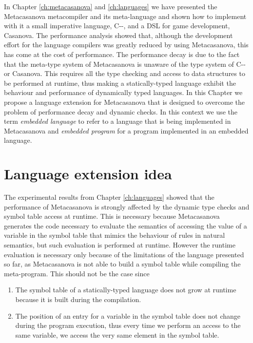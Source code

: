 In Chapter \ref{ch:metacasanova} and \ref{ch:languages} we have presented the Metacasanova metacompiler and its meta-language and shown how to implement with it a small imperative language, C-{}-, and a DSL for game development, Casanova. The performance analysis showed that, although the development effort for the language compilers was greatly reduced by using Metacasanova, this has come at the cost of performance. The performance decay is due to the fact that the meta-type system of Metacasanova is unaware of the type system of C-{}- or Casanova. This requires all the type checking and access to data structures to be performed at runtime, thus making a statically-typed language exhibit the behaviour and performance of dynamically typed languages. In this Chapter we propose a language extension \cite{DiGiacomo2017SLE} for Metacasanova that is designed to overcome the problem of performance decay and dynamic checks. In this context we use the term \textit{embedded language} to refer to a language that is being implemented in Metacasanova and \textit{embedded program} for a program implemented in an embedded language.

\section{Language extension idea}
\label{sec:ch_functors_idea}
The experimental results from Chapter \ref{ch:languages} showed that the performance of Metacasanova is strongly affected by the dynamic type checks and symbol table access at runtime. This is necessary because Metacasanova generates the code necessary to evaluate the semantics of accessing the value of a variable in the symbol table that mimics the behaviour of rules in natural semantics, but such evaluation is performed at runtime. However the runtime evaluation is necessary only because of the limitations of the language presented so far, as Metacasanova is not able to build a symbol table while compiling the meta-program. This should not be the case since

\begin{enumerate}
	\item The symbol table of a statically-typed language does not grow at runtime because it is built during the compilation.
	\item The position of an entry for a variable in the symbol table does not change during the program execution, thus every time we perform an access to the same variable, we access the very same element in the symbol table.
\end{enumerate}

